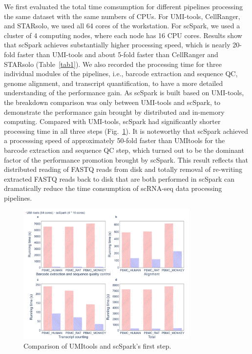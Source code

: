 \documentclass[conference]{IEEEtran}
\begin{document}
We first evaluated the total time comsumption for different pipelines processing the same dataset with the same numbers of CPUs. 
For UMI-tools, CellRanger, and STARsolo, we used all 64 cores of the workstation. 
For scSpark, we used a cluster of 4 computing nodes, where each node has 16 CPU cores. 
Results show that scSpark achieves substantially higher processing speed, which is nearly 20-fold faster than UMI-tools and about 5-fold faster than CellRanger and STARsolo (Table~\ref{tab1}). 
We also recorded the processing time for three individual modules of the pipelines, i.e., barcode extraction and sequence QC, genome alignment, and transcript quantification, to have a more detailed understanding of the performance gain. 
As scSpark is built based on UMI-tools, the breakdown comparison was only between UMI-tools and scSpark, to demonstrate the performance gain brought by distributed and in-memory computing. Compared with UMI-tools, scSpark had significantly shorter processing time in all three steps (Fig.~\ref{fig4}). It is noteworthy that scSpark achieved a processsing speed of approximately 50-fold  faster than UMI\-tools for the barcode extraction and sequence QC step, which turned out to be the dominant factor of the performance promotion brought by scSpark. This result reflects that distributed reading of FASTQ reads from disk and totally removal of re-writing extracted FASTQ reads back to disk that are both performed in scSpark can dramatically reduce the time consumption of scRNA-seq data processing pipelines. 

\begin{figure}
	\includegraphics[width=0.8\textwidth]{Fig4.pdf}
	\caption{Comparison of UMI\-tools and scSpark's first step.} \label{fig4}
\end{figure}
\end{document}
